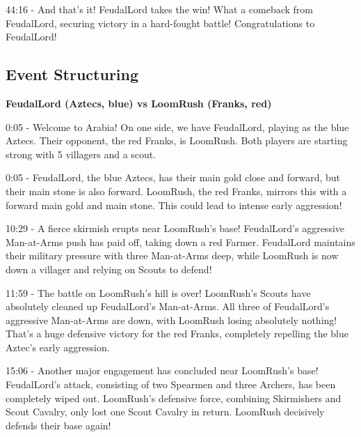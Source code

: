 44:16 - And that's it! FeudalLord takes the win! What a comeback from FeudalLord, securing victory in a hard-fought battle! Congratulations to FeudalLord! \par \vspace{1em}

\subsection{Event Structuring}
\textbf{FeudalLord (Aztecs, blue) vs LoomRush (Franks, red)}

0:05 - Welcome to Arabia! On one side, we have FeudalLord, playing as the blue Aztecs. Their opponent, the red Franks, is LoomRush. Both players are starting strong with 5 villagers and a scout. \par \vspace{1em}

0:05 - FeudalLord, the blue Aztecs, has their main gold close and forward, but their main stone is also forward. LoomRush, the red Franks, mirrors this with a forward main gold and main stone. This could lead to intense early aggression! \par \vspace{1em}

10:29 - A fierce skirmish erupts near LoomRush's base! FeudalLord's aggressive Man-at-Arms push has paid off, taking down a red Farmer. FeudalLord maintains their military pressure with three Man-at-Arms deep, while LoomRush is now down a villager and relying on Scouts to defend! \par \vspace{1em}

11:59 - The battle on LoomRush's hill is over! LoomRush's Scouts have absolutely cleaned up FeudalLord's Man-at-Arms. All three of FeudalLord's aggressive Man-at-Arms are down, with LoomRush losing absolutely nothing! That's a huge defensive victory for the red Franks, completely repelling the blue Aztec's early aggression. \par \vspace{1em}

15:06 - Another major engagement has concluded near LoomRush's base! FeudalLord's attack, consisting of two Spearmen and three Archers, has been completely wiped out. LoomRush's defensive force, combining Skirmishers and Scout Cavalry, only lost one Scout Cavalry in return. LoomRush decisively defends their base again! \par \vspace{1em}

